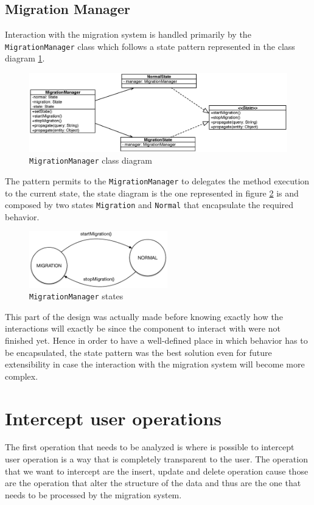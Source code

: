 \subsection{Migration Manager}
Interaction with the migration system is handled primarily by the \texttt{MigrationManager} class which follows a state pattern represented in the class diagram \ref{fig:migration-class-diagram}. 
 
\begin{figure}[tbh]
  \centering
  \includegraphics[width=14cm]{images/migration_class_diagram}
  \caption{\texttt{MigrationManager} class diagram}
  \label{fig:migration-class-diagram}
\end{figure} 

\noindent The pattern permits to the \texttt{MigrationManager} to delegates the method execution to the current state, the state diagram is the one represented in figure \ref{fig:migration-fsa} is and composed by two states \texttt{Migration} and \texttt{Normal} that encapsulate the required behavior.
    
\begin{figure}[tbh]
  \centering
  \includegraphics[width=6cm]{images/migration_fsa}
  \caption{\texttt{MigrationManager} states}
  \label{fig:migration-fsa}
\end{figure} 

\noindent This part of the design was actually made before knowing exactly how the interactions will exactly be since the component to interact with were not finished yet. Hence in order to have a well-defined place in which behavior has to be encapsulated, the state pattern was the best solution even for future extensibility in case the interaction with the migration system will become more complex.  

\section{Intercept user operations}
The first operation that needs to be analyzed is where is possible to intercept user operation is a way that is completely transparent to the user.
The operation that we want to intercept are the insert, update and delete operation cause those are the operation that alter the structure of the data and thus are the one that needs to be processed by the migration system.

